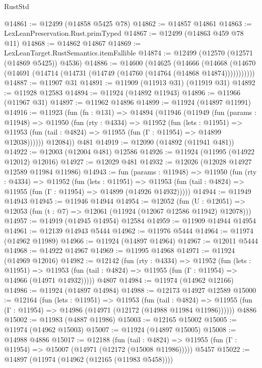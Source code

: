 \begin{lexlean}{RustStd}
\begin{coremodule}
@14861 := @12499 (@14858 @5425 @78)
@14862 := @14857 @14861
@14863 := LexLeanPreservation.Rust.primTyped
@14867 := @12499 (@14863 @459 @78 @11)
@14868 := @14862 @14867
@14869 := LexLeanTarget.RustSemantics.itemFallible
@14874 := @12499 (@12570 (@12571 (@14869 @5425)) @4536)
@14886 := @14600
    (@14625
      (@14666
        (@14668 (@14670 (@14691 (@14714 (@14731 (@14749 (@14760 (@14764 (@14868 @14874)))))))))))
@14887 := @11907 @31
@14891 := @11909 (@11913 @31) (@11919 @31)
@14892 := @11928 @12583
@14894 := @11924 (@14892 @11943)
@14896 := @11966 (@11967 @31)
@14897 := @11962 @14896
@14899 := @11924 (@14897 @11991)
@14916 := @11923
    (fun (fn : @131) =>
    @14894
      (@11946
        (@11949
          (fun (params : @11948) =>
          @11950
            (fun (rty : @4334) =>
            @11952
              (fun (lets : @11951) =>
              @11953 (fun (tail : @4824) => @11955 (fun (Γ : @11954) => @14899 @12038))))))
        @12084))
    @481
@14919 := @12090 (@14892 (@11941 @481))
@14922 := @12003 (@12004 @481) @12586
@14926 := @11924 (@11995 (@14922 @12012) @12016)
@14927 := @12029 @481
@14932 := @12026 (@12028 @14927 @12589 @11984 @11986)
@14943 := fun (params : @11948) =>
  @11950
    (fun (rty : @4334) =>
    @11952
      (fun (lets : @11951) =>
      @11953 (fun (tail : @4824) => @11955 (fun (Γ : @11954) => @14899 (@14926 @14932)))))
@14944 := @11949 @14943
@14945 := @11946 @14944
@14954 := @12052
    (fun (U : @12051) => @12053 (fun (t : @7) => @12061 (@11924 (@12067 @12586 @11942) @12078)))
@14957 := @14919 (@14945 @14954) @12584
@14959 := @11909 @14944 @14954
@14961 := @12139 @14943 @5444
@14962 := @11976 @5444
@14964 := @11974 (@14962 @11989)
@14966 := @11924 (@14897 @14964)
@14967 := @12011 @5444
@14968 := @14922 @14967
@14969 := @11995 @14968
@14971 := @11924 (@14969 @12016)
@14982 := @12142
    (fun (rty : @4334) =>
    @11952
      (fun (lets : @11951) =>
      @11953 (fun (tail : @4824) => @11955 (fun (Γ : @11954) => @14966 (@14971 @14932)))))
    @4807
@14984 := @11974 (@14962 @12166)
@14986 := @11924 (@14897 @14984)
@14988 := @12173 @14927 @12589
@15000 := @12164
    (fun (lets : @11951) =>
    @11953
      (fun (tail : @4824) =>
      @11955 (fun (Γ : @11954) => @14986 (@14971 (@12172 (@14988 @11984 @11986))))))
    @4886
@15002 := @11983 (@4887 @11986)
@15003 := @12165 @15002
@15005 := @11974 (@14962 @15003)
@15007 := @11924 (@14897 @15005)
@15008 := @14988 @4886
@15017 := @12188
    (fun (tail : @4824) => @11955 (fun (Γ : @11954) => @15007 (@14971 (@12172 (@15008 @11986)))))
    @5457
@15022 := @14897 (@11974 (@14962 (@12165 (@11983 @5458))))

\end{coremodule}
\end{lexlean}
